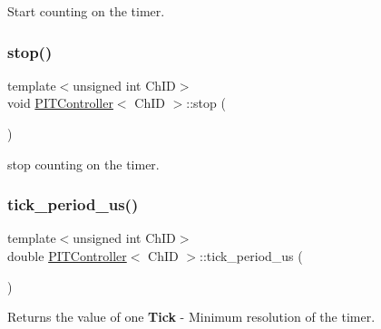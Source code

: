 Start counting on the timer. 

\mbox{\label{group__Controls_ga5a6e2b00c6355934531a77a62660bec7}} 
\subsubsection{\texorpdfstring{stop()}{stop()}}
{\footnotesize\ttfamily template$<$unsigned int Ch\+ID$>$ \\
void \hyperlink{classPITController}{P\+I\+T\+Controller}$<$ Ch\+ID $>$\+::stop (\begin{DoxyParamCaption}{ }\end{DoxyParamCaption})\hspace{0.3cm}{\ttfamily [inline]}}



stop counting on the timer. 

\mbox{\label{group__Controls_ga2b64ce8a01dc1254002c4ff3c384a6fd}} 
\subsubsection{\texorpdfstring{tick\+\_\+period\+\_\+us()}{tick\_period\_us()}}
{\footnotesize\ttfamily template$<$unsigned int Ch\+ID$>$ \\
double \hyperlink{classPITController}{P\+I\+T\+Controller}$<$ Ch\+ID $>$\+::tick\+\_\+period\+\_\+us (\begin{DoxyParamCaption}{ }\end{DoxyParamCaption})\hspace{0.3cm}{\ttfamily [inline]}}



Returns the value of one {\bfseries Tick} -\/ Minimum resolution of the timer. 


